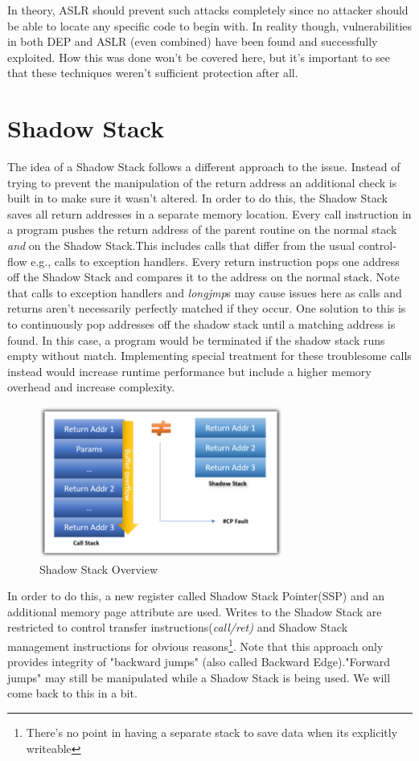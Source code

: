 \documentclass[10pt,twocolumn,a4paper]{article}
\begin{document}
\newline
In theory, ASLR should prevent such attacks completely since no attacker should be able to locate any specific code to begin with.
In reality though, vulnerabilities in both DEP and ASLR (even combined) have been found and successfully exploited.
How this was done won't be covered here, but it's important to see that these techniques weren't sufficient protection after all.

\section{Shadow Stack}\label{shadowstack}
The idea of a Shadow Stack follows a different approach to the issue.
Instead of trying to prevent the manipulation of the return address an additional check is built in to make sure it wasn't altered.
In order to do this, the Shadow Stack saves all return addresses in a separate memory location.
Every call instruction in a program pushes the return address of the parent routine on the normal stack \emph{and} on the Shadow Stack.This includes calls that differ from the usual control-flow e.g., calls to exception handlers.
Every return instruction pops one address off the Shadow Stack and compares it to the address on the normal stack.
Note that calls to exception handlers and \emph{longjmp}s may cause issues here as calls and returns aren't necessarily perfectly matched if they occur\cite{light}.
One solution to this is to continuously pop addresses off the shadow stack until a matching address is found. In this case, a program would be terminated if the shadow stack runs empty without match.
Implementing special treatment for these troublesome calls instead would increase runtime performance but include a higher memory overhead and increase complexity.
\begin{figure}[h]
\includegraphics[keepaspectratio,width=8cm]{fig/Shadow Stack}
\caption{Shadow Stack Overview}
\end{figure}
\newline
In order to do this, a new register called Shadow Stack Pointer(SSP) and an additional memory page attribute are used.
Writes to the Shadow Stack are restricted to control transfer instructions(\emph{call/ret)} and Shadow Stack management instructions for obvious reasons\footnote{There's no point in having a separate stack to save data when its explicitly writeable}.
Note that this approach only provides integrity of "backward jumps" (also called Backward Edge)."Forward jumps" may still be manipulated while a Shadow Stack is being used. We will come back to this in a bit.
\end{document}
